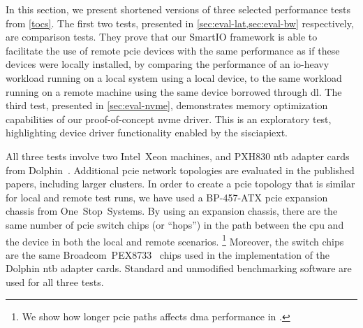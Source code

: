 In this section, we present shortened versions of three selected performance tests from \cref{tocs}.
%
The first two tests, presented in \cref{sec:eval-lat,sec:eval-bw} respectively, are comparison tests.
%
They prove that our SmartIO framework is able to facilitate the use of remote \gls{pcie} devices with the same performance as if these devices were locally installed, by comparing the performance of an \gls{io}-heavy workload running on a local system using a local device, to the same workload running on a remote machine using the same device borrowed through \gls{dl}.
%
The third test, presented in \cref{sec:eval-nvme}, demonstrates memory optimization capabilities of our proof-of-concept \gls{nvme} driver.
%
This is an exploratory test, highlighting device driver functionality enabled by the \gls{sisciapiext}.



All three tests involve two Intel~Xeon machines, and PXH830 \gls{ntb} adapter cards from Dolphin~\cite{pxh830}.
%
Additional \gls{pcie} network topologies are evaluated in the published papers, including larger clusters.
%
In order to create a \gls{pcie} topology that is similar for local and remote test runs, we have used a BP-457-ATX \gls{pcie} expansion chassis from One~Stop~Systems.
%
By using an expansion chassis, there are the same number of \gls{pcie} switch chips (or ``hops'') in the path between the \gls{cpu} and the device in both the local and remote scenarios.%
\footnote{We show how longer \gls{pcie} paths affects \gls{dma} performance in .}
%
Moreover, the switch chips are the same  Broadcom~PEX8733~\cite{pex8733} chips used in the implementation of the Dolphin \gls{ntb} adapter cards.
%
Standard and unmodified benchmarking software are used for all three tests.


